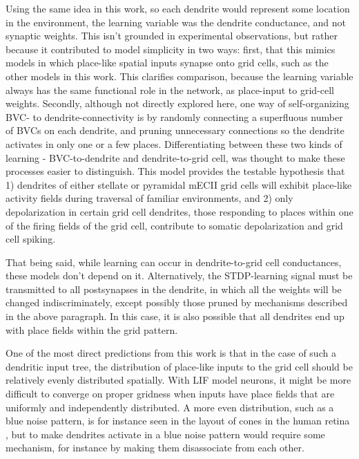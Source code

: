 \documentclass{article}
\begin{document}
    Using the same idea in this work, so each dendrite would represent some location in the environment, the learning variable was the dendrite conductance, and not synaptic weights. This isn't grounded in experimental observations, but rather because it contributed to model simplicity in two ways: first, that this mimics models in which place-like spatial inputs synapse onto grid cells, such as the other models in this work. This clarifies comparison, because the learning variable always has the same functional role in the network, as place-input to grid-cell weights. Secondly, although not directly explored here, one way of self-organizing BVC- to dendrite-connectivity is by randomly connecting a superfluous number of BVCs on each dendrite, and pruning unnecessary connections so the dendrite activates in only one or a few places. Differentiating between these two kinds of learning - BVC-to-dendrite and dendrite-to-grid cell, was thought to make these processes easier to distinguish. 
    This model provides the testable hypothesis that 1) dendrites of either stellate or pyramidal mECII grid cells will exhibit place-like activity fields during traversal of familiar environments, and 2) only depolarization in certain grid cell dendrites, those responding to places within one of the firing fields of the grid cell, contribute to somatic depolarization and grid cell spiking.

    That being said, while learning can occur in dendrite-to-grid cell conductances, these models don't depend on it. Alternatively, the STDP-learning signal must be transmitted to all postsynapses in the dendrite, in which all the weights will be changed indiscriminately, except possibly those pruned by mechanisms described in the above paragraph. In this case, it is also possible that all dendrites end up with place fields within the grid pattern.

    One of the most direct predictions from this work is that in the case of such a dendritic input tree, the distribution of place-like inputs to the grid cell should be relatively evenly distributed spatially. With LIF model neurons, it might be more difficult to converge on proper gridness when inputs have place fields that are uniformly and independently distributed. A more even distribution, such as a blue noise pattern, is for instance seen in the layout of cones in the human retina \parencite{Yellott1983}, but to make dendrites activate in a blue noise pattern would require some mechanism, for instance by making them disassociate from each other.
\end{document}
